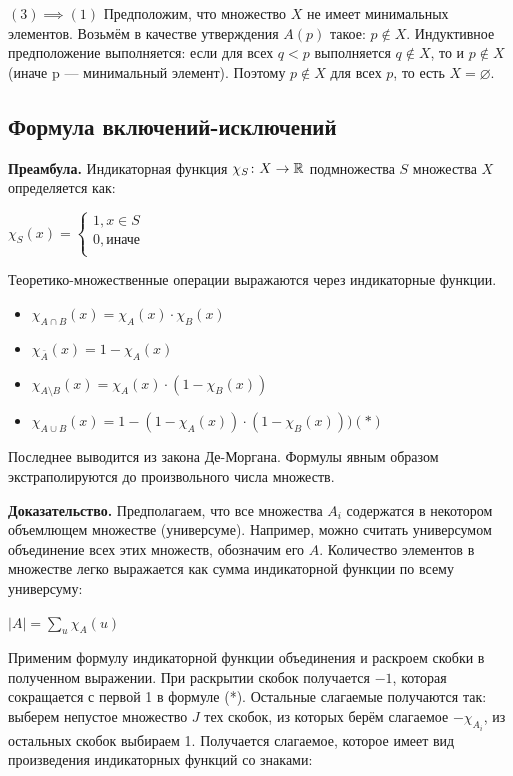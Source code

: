 \documentclass[a4paper, 10pt]{article}
\begin{document}
$(3) \implies (1)$ Предположим, что множество $X$ не имеет минимальных элементов. Возьмём в качестве утверждения $A(p)$ такое: $p \notin X$.
Индуктивное предположение выполняется: если для всех $q < p$ выполняется $q \notin X$, то и $p \notin X$ (иначе p — минимальный элемент). Поэтому $p \notin X$ для всех $p$, то есть $X = \varnothing$.

\subsection{Формула включений-исключений}

\textbf{Преамбула.} Индикаторная функция $\chi_S \colon X \to \mathbb{R}$ подмножества $S$ множества $X$ определяется как$\colon$

\smallskip

$\chi_S(x) =\begin{cases}
    1, x \in S \\
    0, \textit{иначе} \\
\end{cases}$

Теоретико-множественные операции выражаются через индикаторные функции.

\begin{itemize}
    \item $\chi_{A \cap B}(x) = \chi_A(x) \cdot \chi_B(x)$
    \item $\chi_{\bar A}(x) = 1 - \chi_A(x)$
    \item $\chi_{A \setminus B}(x) = \chi_A(x) \cdot (1 - \chi_B(x))$
    \item $\chi_{A \cup B}(x) = 1 - (1 - \chi_A(x)) \cdot (1 - \chi_B(x))) (*)$
\end{itemize}

Последнее выводится из закона Де-Моргана. Формулы явным образом экстраполируются до произвольного числа множеств.

\textbf{Доказательство.} Предполагаем, что все множества $A_i$ содержатся в некотором объемлющем множестве (универсуме). Например, можно считать универсумом объединение всех этих множеств, обозначим его $A$. Количество элементов в множестве легко выражается как сумма индикаторной функции по всему универсуму:

\begin{center}
    $|A| = \displaystyle \sum_u \chi_A(u)$ \\
\end{center}

Применим формулу индикаторной функции объединения и раскроем скобки в полученном выражении. При раскрытии скобок получается $-1$, которая сокращается с первой 1 в формуле (*). Остальные слагаемые получаются так: выберем непустое множество $J$ тех скобок, из которых берём слагаемое $-\chi_{A_i}$, из остальных скобок выбираем 1. Получается слагаемое, которое имеет вид произведения индикаторных функций со знаками:
\end{document}
